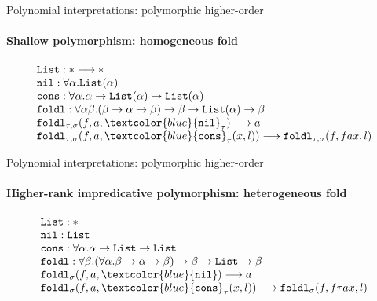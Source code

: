 \documentclass[10pt,presentation,color=names]{beamer}
\newcommand{\arrtype}{\rightarrow}
\newcommand{\red}{\longrightarrow}
\newcommand{\symb}[1]{\textcolor{blue}{\mathtt{#1}}}
\newcommand{\List}{\mathtt{List}}
\newcommand{\nil}{\symb{nil}}
\newcommand{\cons}{\symb{cons}}
\begin{document}
\begin{frame}{Polynomial interpretations: polymorphic higher-order}
  \framesubtitle{Shallow polymorphism: homogeneous fold}
  \[
  \begin{array}{l}
    \List : * \red * \\
    \mathtt{nil} : \forall \alpha . \List(\alpha) \\
    \mathtt{cons} : \forall \alpha . \alpha \arrtype \List(\alpha) \arrtype \List(\alpha) \quad\quad \\
    \mathtt{foldl} : \forall \alpha \beta . (\beta \arrtype \alpha \arrtype \beta) \arrtype \beta \arrtype \List(\alpha) \arrtype \beta \\
    \mathtt{foldl}_{\tau,\sigma}(f,a,\nil_\tau) \red a \\
    \mathtt{foldl}_{\tau,\sigma}(f,a,\cons_\tau(x,l)) \red \mathtt{foldl}_{\tau,\sigma}(f,f a x,l)
  \end{array}
  \]
\end{frame}

\begin{frame}{Polynomial interpretations: polymorphic higher-order}
  \framesubtitle{Higher-rank impredicative polymorphism: heterogeneous fold}
  \[
  \begin{array}{l}
    \List : * \\
    \mathtt{nil} : \List \\
    \mathtt{cons} : \forall \alpha . \alpha \arrtype \List \arrtype \List \quad\quad \\
    \mathtt{foldl} : \forall \beta . (\forall \alpha . \beta \arrtype \alpha \arrtype \beta) \arrtype \beta \arrtype \List \arrtype \beta \\
    \mathtt{foldl}_\sigma(f,a,\nil) \red a \\
    \mathtt{foldl}_\sigma(f,a,\cons_\tau(x,l)) \red \mathtt{foldl}_\sigma(f,f \tau a x,l)
  \end{array}
  \]
\end{frame}
\end{document}
